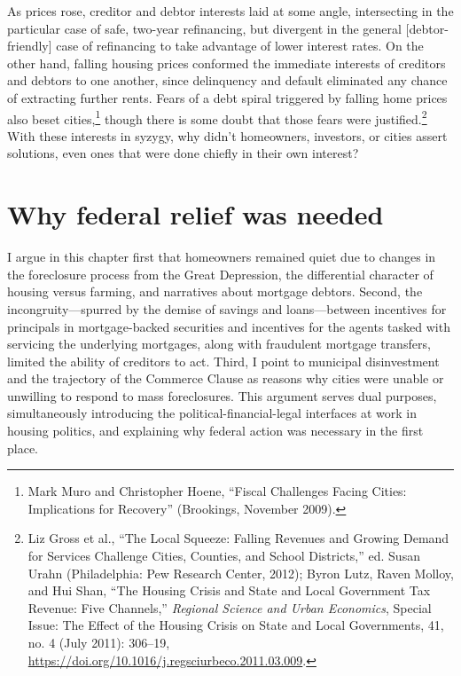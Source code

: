 \documentclass[12pt,oneside]{psthesis}
\begin{document}
As prices rose, creditor and debtor interests laid at some angle, intersecting in the particular case of safe, two-year refinancing, but divergent in the general {[}debtor-friendly{]} case of refinancing to take advantage of lower interest rates.
On the other hand, falling housing prices conformed the immediate interests of creditors and debtors to one another, since delinquency and default eliminated any chance of extracting further rents.
Fears of a debt spiral triggered by falling home prices also beset cities,\footnote{Mark Muro and Christopher Hoene, ``Fiscal Challenges Facing Cities: Implications for Recovery'' (Brookings, November 2009).} though there is some doubt that those fears were justified.\footnote{Liz Gross et al., ``The Local Squeeze: Falling Revenues and Growing Demand for Services Challenge Cities, Counties, and School Districts,'' ed. Susan Urahn (Philadelphia: Pew Research Center, 2012); Byron Lutz, Raven Molloy, and Hui Shan, ``The Housing Crisis and State and Local Government Tax Revenue: Five Channels,'' \emph{Regional Science and Urban Economics}, Special Issue: The Effect of the Housing Crisis on State and Local Governments, 41, no. 4 (July 2011): 306--19, \url{https://doi.org/10.1016/j.regsciurbeco.2011.03.009}.}
With these interests in syzygy, why didn't homeowners, investors, or cities assert solutions, even ones that were done chiefly in their own interest?

\hypertarget{why-federal-relief-was-needed}{%
\section{Why federal relief was needed}\label{why-federal-relief-was-needed}}

I argue in this chapter first that homeowners remained quiet due to changes in the foreclosure process from the Great Depression, the differential character of housing versus farming, and narratives about mortgage debtors.
Second, the incongruity---spurred by the demise of savings and loans---between incentives for principals in mortgage-backed securities and incentives for the agents tasked with servicing the underlying mortgages, along with fraudulent mortgage transfers, limited the ability of creditors to act.
Third, I point to municipal disinvestment and the trajectory of the Commerce Clause as reasons why cities were unable or unwilling to respond to mass foreclosures.
This argument serves dual purposes, simultaneously introducing the political-financial-legal interfaces at work in housing politics, and explaining why federal action was necessary in the first place.
\end{document}
